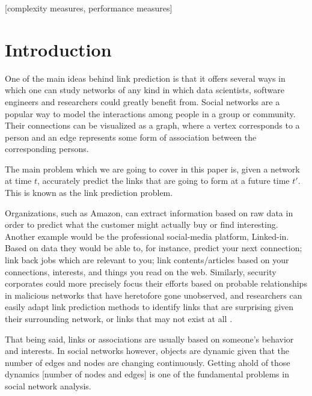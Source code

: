 \documentclass{acm_proc_article-sp}
\begin{document}
[complexity measures, performance measures]



\section{Introduction}
\label{Sect.1}

One of the main ideas behind link prediction is that it offers several ways in which one can study networks of any kind in which data scientists, software engineers and researchers could greatly benefit from. Social networks are a popular way to model the interactions among people in a group or community. Their connections can be visualized as a graph, where a vertex corresponds to a person and an edge represents some form of association between the corresponding persons.

The main problem which we are going to cover in this paper is, given a network at time $t$, accurately predict the links that are going to form at a future time $t'$. This is known as the link prediction problem.

Organizations, such as Amazon, can extract information based on raw data in order to predict what the customer might actually buy or find interesting. Another example would be the professional social-media platform, Linked-in.  Based on data they would be able to, for instance, predict your next connection; link back jobs which are relevant to you; link contents/articles based on your connections, interests, and things you read on the web. Similarly, security corporates could more precisely focus their efforts based on probable relationships in malicious networks that have heretofore gone unobserved, and researchers can easily adapt link prediction methods to identify links that are surprising given their surrounding network, or links that may not exist at all \cite{Lichtenwalter:2010:NPM:1835804.1835837}. 

That being said, links or associations are usually based on someone's behavior and interests. In social networks however, objects are dynamic given that the number of edges and nodes are changing continuously. Getting ahold of those dynamics [number of nodes and edges] is one of the fundamental problems in social network analysis. 
\end{document}

